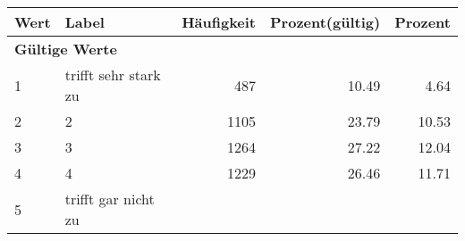      \begin{longtable}{lXrrr}
     \toprule
     \textbf{Wert} & \textbf{Label} & \textbf{Häufigkeit} & \textbf{Prozent(gültig)} & \textbf{Prozent} \\
     \endhead
     \midrule
     \multicolumn{5}{l}{\textbf{Gültige Werte}}\\

     1 &
     \multicolumn{1}{X}{ trifft sehr stark zu   } &


       \num{487} &
       \num[round-mode=places,round-precision=2]{10.49} &
         \num[round-mode=places,round-precision=2]{4.64} \\

     2 &
     \multicolumn{1}{X}{ 2   } &


       \num{1105} &
       \num[round-mode=places,round-precision=2]{23.79} &
         \num[round-mode=places,round-precision=2]{10.53} \\

     3 &
     \multicolumn{1}{X}{ 3   } &


       \num{1264} &
       \num[round-mode=places,round-precision=2]{27.22} &
         \num[round-mode=places,round-precision=2]{12.04} \\

     4 &
     \multicolumn{1}{X}{ 4   } &


       \num{1229} &
       \num[round-mode=places,round-precision=2]{26.46} &
         \num[round-mode=places,round-precision=2]{11.71} \\

     5 &
     \multicolumn{1}{X}{ trifft gar nicht zu   } &



\end{longtable}
